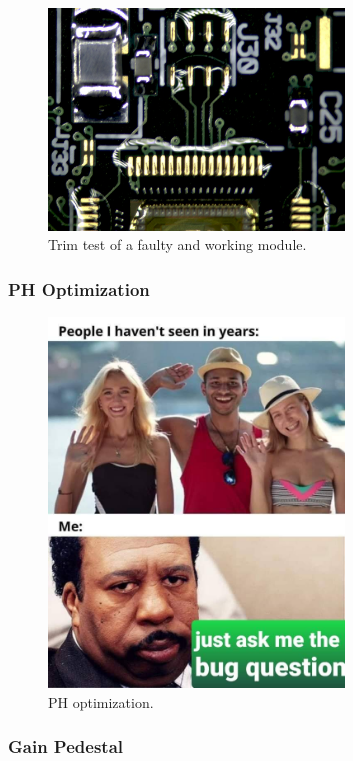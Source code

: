 \begin{figure}[!h]
  \centering
  \includegraphics[width=0.7\textwidth]{../images/ch7/4}
  \caption[Trim test.]{Trim test of a faulty and working module.}\label{fig:vis_insp}
\end{figure}


\subsubsection{PH Optimization}


\begin{figure}[!h]
  \centering
  \includegraphics[width=0.7\textwidth]{../images/ch7/5}
  \caption[Ph Optimization.]{PH optimization.}\label{fig:vis_insp}
\end{figure}


\subsubsection{Gain Pedestal}


